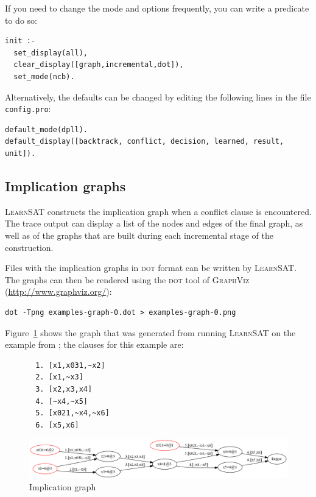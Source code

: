 \documentclass[11pt]{article}
\newcommand*{\p}[1]{\textup{\texttt{#1}}}
\newcommand*{\ls}{\textsc{LearnSAT}}
\newcommand*{\dt}{\textsc{dot}}
\begin{document}
If you need to change the mode and options frequently, you can write a
predicate to do so:
\begin{verbatim}
init :-
  set_display(all),
  clear_display([graph,incremental,dot]),
  set_mode(ncb).
\end{verbatim}

Alternatively, the defaults can be changed by editing the following
lines in the file \p{config.pro}:

\begin{verbatim}
default_mode(dpll).
default_display([backtrack, conflict, decision, learned, result, unit]).
\end{verbatim}

\subsection{Implication graphs}

\ls{} constructs the implication graph when a conflict clause is
encountered. The trace output can display a list of the nodes and edges
of the final graph, as well as of the graphs that are built during
each incremental stage of the construction.

Files with the implication graphs in \dt{} format can be written by
\ls{}.
The graphs can then be rendered using the \dt{} tool of \textsc{GraphViz}
(\url{http://www.graphviz.org/}):
\begin{verbatim}
dot -Tpng examples-graph-0.dot > examples-graph-0.png
\end{verbatim}
Figure~\ref{fig.ig} shows the graph that was generated from running
\ls{} on the example from \cite{mlm}; the clauses for this example are:
\begin{verbatim}
       1. [x1,x031,~x2]
       2. [x1,~x3]
       3. [x2,x3,x4]
       4. [~x4,~x5]
       5. [x021,~x4,~x6]
       6. [x5,x6]
\end{verbatim}

\begin{figure}[tb]
\begin{center}
\includegraphics[keepaspectratio=true,width=\textwidth]{graph}
\caption{Implication graph}\label{fig.ig}
\end{center}
\end{figure}
\end{document}

